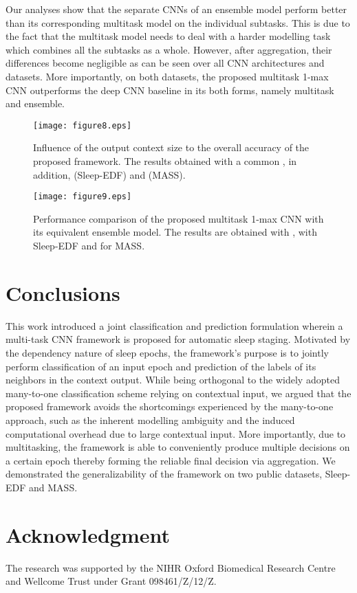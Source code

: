 \documentclass[10pt,twocolumn,twoside]{IEEEtran}
\begin{document}
Our analyses show that the separate CNNs of an ensemble model perform better than its corresponding multitask model on the individual subtasks. This is due to the fact that the multitask model needs to deal with a harder modelling task which combines all the subtasks as a whole. However, after aggregation, their differences become negligible as can be seen over all CNN architectures and datasets. More importantly, on both datasets, the proposed multitask 1-max CNN outperforms the deep CNN baseline in its both forms, namely multitask and ensemble.

\begin{figure} [!t]
		\centering
		\texttt{[image: figure8.eps]}
		\caption{Influence of the output context size to the overall accuracy of the proposed framework. The results obtained with a common , in addition,  (Sleep-EDF) and  (MASS).}
		\label{fig:influence_contextsize}
\end{figure}
\begin{figure} [!t]
		\centering
		\texttt{[image: figure9.eps]}
		\caption{Performance comparison of the proposed multitask 1-max CNN with its equivalent ensemble model. The results are obtained with ,  with Sleep-EDF and  for MASS.}
		\label{fig:multitask_vs_ensemble}
\end{figure}

\section{Conclusions}
\label{sec:conclusion}

This work introduced a joint classification and prediction formulation wherein a multi-task CNN framework is proposed for automatic sleep staging. Motivated by the dependency nature of sleep epochs, the framework's purpose is to jointly perform classification of an input epoch and prediction of the labels of its neighbors in the context output. While being orthogonal to the widely adopted many-to-one classification scheme relying on contextual input, we argued that the proposed framework avoids the shortcomings experienced by the many-to-one approach, such as the inherent modelling ambiguity and the induced computational overhead due to large contextual input. More importantly, due to multitasking, the framework is able to conveniently produce multiple decisions on a certain epoch thereby forming the reliable final decision via aggregation. We demonstrated the generalizability of the framework on two public datasets, Sleep-EDF and MASS.

\section*{Acknowledgment}
The research was supported by the NIHR Oxford Biomedical Research Centre and Wellcome Trust under Grant 098461/Z/12/Z.


\ifCLASSOPTIONcaptionsoff
  \newpage
\fi




\vspace{-0.2cm}


\end{document}
